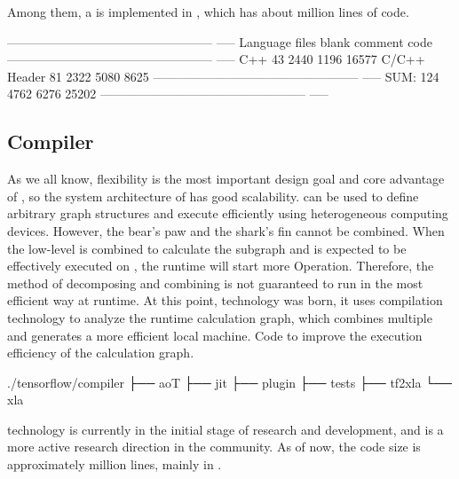 \begin{content}
Among them, a  is implemented in , which has about  million lines of code.

\begin{leftbar}
\begin{python}[caption={StreamExecutorCode Statistics}]
-------------------------------------------------- -----
Language            files     blank   comment      code
-------------------------------------------------- -----
C++                    43      2440      1196     16577
C/C++ Header           81      2322      5080      8625
-------------------------------------------------- -----
SUM:                  124      4762      6276     25202
-------------------------------------------------- -----
\end{python}
\end{leftbar}


\subsection{Compiler}
As we all know, flexibility is the most important design goal and core advantage of \tf{}, so the system architecture of \tf{} has good scalability. \tf{} can be used to define arbitrary graph structures and execute efficiently using heterogeneous computing devices. However, the bear's paw and the shark's fin cannot be combined. When the low-level  is combined to calculate the subgraph and is expected to be effectively executed on , the runtime will start more  Operation.
Therefore, the \tf{} method of decomposing and combining  is not guaranteed to run in the most efficient way at runtime. At this point,  technology was born, it uses  compilation technology to analyze the runtime calculation graph, which combines multiple  and generates a more efficient local machine. Code to improve the execution efficiency of the calculation graph.

\begin{leftbar}
\begin{python}[caption={CompilerSource Structure}]
./tensorflow/compiler
├── aoT
├── jit
├── plugin
├── tests
├── tf2xla
└── xla
\end{python}
\end{leftbar}

 technology is currently in the initial stage of research and development, and is a more active research direction in the community. As of now, the code size is approximately  million lines, mainly in .


\end{content}
